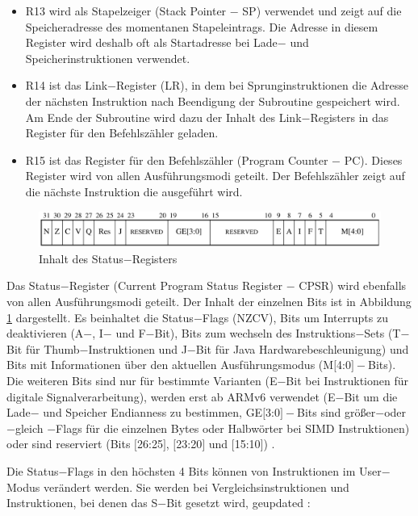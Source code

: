 \documentclass[a4paper, 11pt, onecolumn]{article}
\begin{document}
\begin{itemize}
\item R13 wird als Stapelzeiger (Stack Pointer $-$ SP) verwendet und zeigt auf die Speicheradresse des momentanen Stapeleintrags. Die Adresse in diesem Register wird deshalb oft als Startadresse bei Lade$-$ und Speicherinstruktionen verwendet.
\item R14 ist das Link$-$Register (LR), in dem bei Sprunginstruktionen die Adresse der nächsten Instruktion nach Beendigung der Subroutine gespeichert wird. Am Ende der Subroutine wird dazu der Inhalt des Link$-$Registers in das Register für den Befehlszähler geladen.
\item R15 ist das Register für den Befehlszähler (Program Counter $-$ PC). Dieses Register wird von allen Ausführungsmodi geteilt. Der Befehlszähler zeigt auf die nächste Instruktion die ausgeführt wird.
\end{itemize}

\begin{figure}[!htb]
\centering
\includegraphics[width=1\textwidth]{data/statusregister}
\caption[Status$-$Register]{Inhalt des Status$-$Registers \cite{arm:2005}}
\label{fig:statusregister}
\end{figure}

Das Status$-$Register (Current Program Status Register $-$ CPSR) wird ebenfalls von allen Ausführungsmodi geteilt. Der Inhalt der einzelnen Bits ist in Abbildung \ref{fig:statusregister} dargestellt. Es beinhaltet die Status$-$Flags (NZCV), Bits um Interrupts zu deaktivieren (A$-$, I$-$ und F$-$Bit), Bits zum wechseln des Instruktions$-$Sets (T$-$Bit für Thumb$-$Instruktionen und J$-$Bit für Java Hardwarebeschleunigung) und Bits mit Informationen über den aktuellen Ausführungsmodus (M$[$4:0$]-$Bits). Die weiteren Bits sind nur für bestimmte Varianten (E$-$Bit bei Instruktionen für digitale Signalverarbeitung), werden erst ab ARMv6 verwendet (E$-$Bit um die Lade$-$ und Speicher Endianness zu bestimmen, GE$[$3:0$]-$Bits sind größer$-$oder$-$gleich
$-$Flags für die einzelnen Bytes oder Halbwörter bei SIMD Instruktionen) oder sind reserviert (Bits $[$26:25$]$, $[$23:20$]$ und $[$15:10$]$) \cite{arm:2005}.

Die Status$-$Flags in den höchsten 4 Bits können von Instruktionen im User$-$Modus verändert werden. Sie werden bei Vergleichsinstruktionen und Instruktionen, bei denen das S$-$Bit gesetzt wird, geupdated \cite{arm:2005}:
\end{document}
